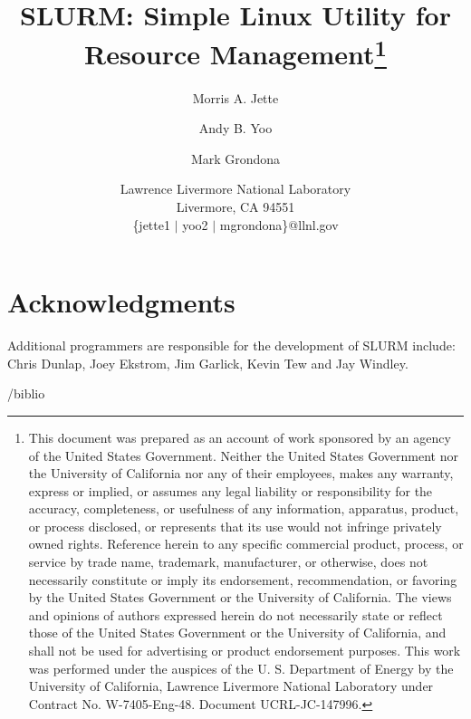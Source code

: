 \documentclass[11pt]{article}
\title{SLURM: Simple Linux Utility for Resource Management\thanks{
This document was prepared as an account of work sponsored by an
agency of the United States Government.  Neither the United States
Government nor the University of California nor any of their
employees, makes any warranty, express or implied, or assumes any
legal liability or responsibility for the accuracy, completeness, or
usefulness of any information, apparatus, product, or process
disclosed, or represents that its use would not infringe privately
owned rights. Reference herein to any specific commercial product,
process, or service by trade name, trademark, manufacturer, or
otherwise, does not necessarily constitute or imply its endorsement,
recommendation, or favoring by the United States Government or the
University of California.  The views and opinions of authors expressed
herein do not necessarily state or reflect those of the United States
Government or the University of California, and shall not be used for
advertising or product endorsement purposes.
This work was performed under the auspices of the U. S. Department of
Energy by the University of California, Lawrence Livermore National
Laboratory under Contract No. W-7405-Eng-48. Document UCRL-JC-147996.}}
\author{Morris A. Jette \and Andy B. Yoo \and Mark Grondona}
\date{Lawrence Livermore National Laboratory\\
Livermore, CA 94551\\
\{jette1 $\mid$ yoo2 $\mid$ mgrondona\}@llnl.gov}
\begin{document}
\maketitle







%



\section*{Acknowledgments}

Additional programmers are responsible for the development of
SLURM include: Chris Dunlap, Joey Ekstrom, Jim Garlick, Kevin Tew
and Jay Windley.

\newpage


/biblio
\end{document}
